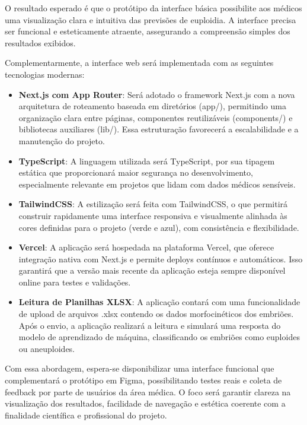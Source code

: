 O resultado esperado é que o protótipo da interface básica possibilite aos médicos uma visualização clara e intuitiva das previsões de euploidia. A interface precisa ser funcional e esteticamente atraente, assegurando a compreensão simples dos resultados exibidos.

Complementarmente, a interface web será implementada com as seguintes tecnologias modernas:

\begin{itemize}
\item \textbf{Next.js com App Router}: Será adotado o framework Next.js com a nova arquitetura de roteamento baseada em diretórios (app/), permitindo uma organização clara entre páginas, componentes reutilizáveis (components/) e bibliotecas auxiliares (lib/). Essa estruturação favorecerá a escalabilidade e a manutenção do projeto.

\item \textbf{TypeScript}: A linguagem utilizada será TypeScript, por sua tipagem estática que proporcionará maior segurança no desenvolvimento, especialmente relevante em projetos que lidam com dados médicos sensíveis.

\item \textbf{TailwindCSS}: A estilização será feita com TailwindCSS, o que permitirá construir rapidamente uma interface responsiva e visualmente alinhada às cores definidas para o projeto (verde e azul), com consistência e flexibilidade.

\item \textbf{Vercel}: A aplicação será hospedada na plataforma Vercel, que oferece integração nativa com Next.js e permite deploys contínuos e automáticos. Isso garantirá que a versão mais recente da aplicação esteja sempre disponível online para testes e validações.

\item \textbf{Leitura de Planilhas XLSX}: A aplicação contará com uma funcionalidade de upload de arquivos .xlsx contendo os dados morfocinéticos dos embriões. Após o envio, a aplicação realizará a leitura e simulará uma resposta do modelo de aprendizado de máquina, classificando os embriões como euploides ou aneuploides.
\end{itemize}

Com essa abordagem, espera-se disponibilizar uma interface funcional que complementará o protótipo em Figma, possibilitando testes reais e coleta de feedback por parte de usuários da área médica. O foco será garantir clareza na visualização dos resultados, facilidade de navegação e estética coerente com a finalidade científica e profissional do projeto.